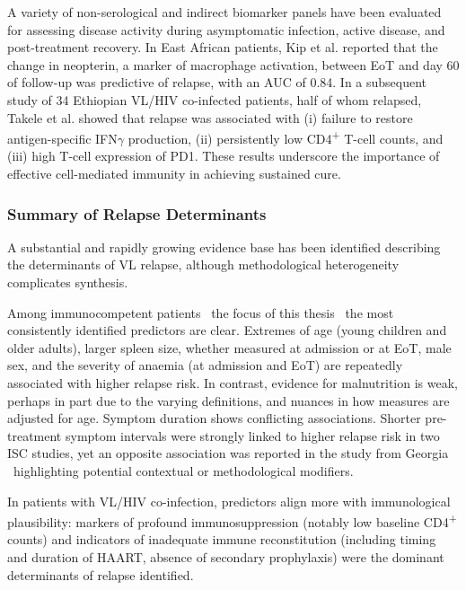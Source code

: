 A variety of non-serological and indirect biomarker panels have been evaluated for assessing disease activity during asymptomatic infection, active disease, and post-treatment recovery\cite{samant2021, takele2022, tadesse2021, guedes2022, kip2018, torres2025}. In East African patients, Kip et al. reported that the change in neopterin, a marker of macrophage activation, between EoT and day 60 of follow-up was predictive of relapse, with an AUC of 0.84\cite{kip2018}. In a subsequent study of 34 Ethiopian VL/HIV co-infected patients, half of whom relapsed, Takele et al. showed that relapse was associated with (i) failure to restore antigen-specific IFN$\gamma$ production, (ii) persistently low CD4\textsuperscript{+} T-cell counts, and (iii) high T-cell expression of PD1. These results underscore the importance of effective cell-mediated immunity in achieving sustained cure.

\subsubsection{Summary of Relapse Determinants}

A substantial and rapidly growing evidence base has been identified describing the determinants of VL relapse, although methodological heterogeneity complicates synthesis.

Among immunocompetent patients \textemdash\  the focus of this thesis \textemdash\  the most consistently identified predictors are clear. Extremes of age (young children and older adults), larger spleen size, whether measured at admission or at EoT, male sex, and the severity of anaemia (at admission and EoT) are repeatedly associated with higher relapse risk. In contrast, evidence for malnutrition is weak, perhaps in part due to the varying definitions, and nuances in how measures are adjusted for age. Symptom duration shows conflicting associations. Shorter pre-treatment symptom intervals were strongly linked to higher relapse risk in two ISC studies, yet an opposite association was reported in the study from Georgia \textemdash\  highlighting potential contextual or methodological modifiers.

In patients with VL/HIV co-infection, predictors align more with immunological plausibility: markers of profound immunosuppression (notably low baseline CD4\textsuperscript{+} counts) and indicators of inadequate immune reconstitution (including timing and duration of HAART, absence of secondary prophylaxis) were the dominant determinants of relapse identified.

